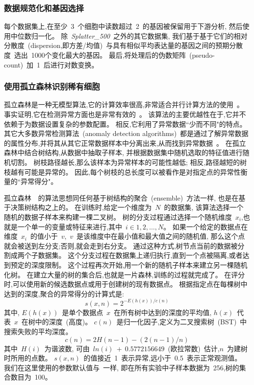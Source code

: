 \subsubsection{数据规范化和基因选择}
\label{subsec:datapreprocessing} 
每个数据集上,在至少~3~个细胞中读数超过~2~的基因被保留用于下游分析,
然后使用中位数归一化。
除~\textit{Splatter\_500}~之外的其它数据集,
我们基于基于它们的相对分散度~(dispersion,即方差/均值)~与具有相似平均表达量的基因之间的预期分散度~\cite{zheng2017massively,macosko2015highly}选出~1000个变化最大的基因。
最后,将处理后的伪数矩阵~(pseudo-count)~加~1~后进行对数变换。

\subsubsection{使用孤立森林识别稀有细胞}
\label{subsec:if} 

孤立森林是一种无模型算法,它的计算效率很高,非常适合并行计算方法的使用~\cite{hariri2018batch}。
事实证明,它在检测异常方面也是非常有效的~\cite{susto2017anomaly}。
该算法的主要优越性在于,它并不依赖于为数据设置复杂的参数配置。
相反,它利用了异常数据``少而不同"的特点。
其它大多数异常检测算法~(anomaly detection algorithms)~都是通过了解异常数据的属性分布,并将其从其它正常数据样本中分离出来,从而找到异常数据~\cite{noto2010anomaly,chen2011ordinal,das2016incorporating}。
在孤立森林中结合树结构,从数据中抽取子样本,
并根据数据集中随机选取的特征值进行随机切割。
树枝路径越长,那么该样本为异常样本的可能性越低;
相反,路径越短的树枝越有可能是异常的。
因此,每个树枝的总长度可以被看作是对指定点的异常性衡量的``异常得分"。

孤立森林~\cite{liu2008isolation,liu2012isolation}~的算法思想同任何基于树结构的聚合~(ensemble)~方法一样,
也是在基于决策树结构之上的。
在训练时,给定一个维度为~$N$~的数据集,
该算法选择一个随机的数据子样本来构建一棵二叉树。
树的分支过程通过选择一个随机维度~$x_i$,也就是一个单一的变量或特征来进行,其中~$i \in {1,2,\ldots,N}$。
如果一个给定的数据点在维度~$x_i$~的值小于~$v$,~$v$~是该维度中在最小值和最大值之间的随机值,
那么这个点就会被送到左分支;否则,就会走到右分支。
通过这种方式,树节点当前的数据被分割成两个子数据集。
这个分支过程在数据集上递归执行,直到一个点被隔离,或者达到预定的深度限制。
这个过程再次开始,用一个新的随机子样本来建立另一棵随机化树。
在建立大量的树的集合后,也就是一片森林,训练的过程就完成了。
在评分时,可以使用新的候选数据点或用于创建树的现有数据点。
根据指定点在每棵树中达到的深度,聚合的异常得分的计算式是:
\begin{equation}
    \label{as}
    s(x,n) = 2^{-E(h(x))/c(n)}
\end{equation}
其中, $E(h(x))$~是单个数据点~$x$~在所有树中达到的深度的平均值, $h(x)$~代表~$x$~在树中的深度~(高度)。 
$c(n)$~是归一化因子,定义为二叉搜索树~(BST)~中搜索失败的平均深度。
\begin{equation}
    \label{lab:as}
    c(n) = 2H(n - 1) - (2(n - 1)/n)
\end{equation}
其中~$H(i)$~为谐波数,
可由~$ln(i)~+~0.5772156649$~(欧拉常数)~\cite{liu2012isolation}估计,$n$~为建树时所用的点数。
$s(x,n)$~的值接近~1~表示异常,远小于~0.5~表示正常观测值。
我们在这里使用的参数默认值与~\cite{liu2008isolation,liu2012isolation}一样,
即在所有实验中子样本数据为~256,树的集合数目为~100。

